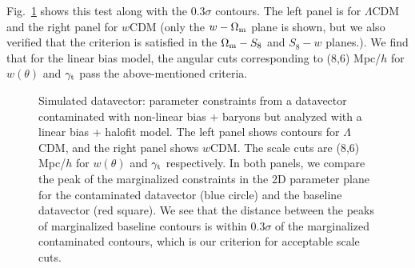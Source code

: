 \documentclass[fleqn,usenatbib]{mnras}
\newcommand{\lcdm}{$\Lambda$CDM}
\newcommand{\wcdm}{$w$CDM}
\begin{document}
Fig.~\ref{fig:sim_lin} shows this test along with the 0.3$\sigma$ contours. The left panel is for $\Lambda$CDM and the right panel for $w$CDM (only the $w- \Omega_{\rm m}$ plane is shown, but we also verified that the criterion is satisfied in the $\Omega_{\rm m}-S_8$ and $S_8-w$  planes.). We find that for the linear bias model, the angular cuts corresponding to (8,6) Mpc/$h$ for $w(\theta)$ and $\gamma_{\rm t}$ pass the above-mentioned criteria. 

\begin{figure}
\centering
{}
\hfill
{}
    \caption[]{Simulated datavector: parameter constraints from a datavector contaminated with non-linear bias + baryons but analyzed with a linear bias + halofit model. The left panel shows contours for \lcdm, and the right panel shows \wcdm. The scale cuts are (8,6) Mpc/$h$ for $w(\theta)$ and $\gamma_{\rm t}$ respectively. In both panels, we compare the peak of the marginalized constraints in the 2D  parameter plane for the contaminated datavector (blue circle) and the baseline datavector  (red square). We see that the distance between the peaks of marginalized baseline contours is within 0.3$\sigma$ of the marginalized contaminated contours, which is our criterion for acceptable scale cuts. }
\label{fig:sim_lin}    
\end{figure}
\end{document}
